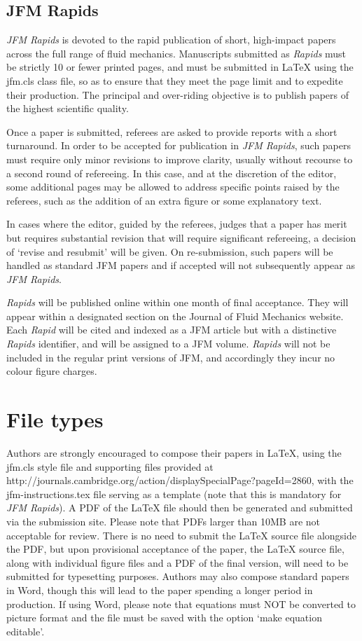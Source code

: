 \documentclass{jfm}
\begin{document}
\subsection{JFM Rapids}
{\it JFM Rapids} is devoted to the rapid publication of short, high-impact papers across the full range of fluid mechanics. Manuscripts submitted as {\it Rapids}  must be strictly 10 or fewer printed pages, and must be submitted in {\LaTeX} using the jfm.cls class file, so as to ensure that they meet the page limit and to expedite their production.  The principal and over-riding objective is to publish papers of the highest scientific quality. 

Once a paper is submitted, referees are asked to provide reports with a short turnaround.  In order to be accepted for publication in {\it JFM Rapids}, such papers must require only minor revisions to improve clarity, usually without recourse to a second round of refereeing. In this case, and at the discretion of the editor, some additional pages may be allowed to address specific points raised by the referees, such as the addition of an extra figure or some explanatory text.  

In cases where the editor, guided by the referees, judges that a paper has merit but requires substantial revision that will require significant refereeing, a decision of `revise and resubmit' will be given. On re-submission, such papers will be handled as standard JFM papers and if accepted will not subsequently appear as {\it JFM Rapids}.

{\it Rapids} will be published online within one month of final acceptance.  They will appear within a designated section on the Journal of Fluid Mechanics website.  Each {\it Rapid} will be cited and indexed as a JFM article but with a distinctive {\it Rapids} identifier, and will be assigned to a JFM volume. {\it Rapids} will not be included in the regular print versions of JFM, and accordingly they incur no colour figure charges.
 
\section{File types}\label{sec:filetypes}
Authors are strongly encouraged to compose their papers in {\LaTeX}, using the jfm.cls style file and supporting files provided at\\ http://journals.cambridge.org/action/displaySpecialPage?pageId=2860, with the jfm-instructions.tex file serving as a template (note that this is mandatory for {\it JFM Rapids}). A PDF of the {\LaTeX} file should then be generated and submitted via the submission site. Please note that PDFs larger than 10MB are not acceptable for review. There is no need to submit the {\LaTeX} source file alongside the PDF, but upon provisional acceptance of the paper, the {\LaTeX} source file, along with individual figure files and a PDF of the final version, will need to be submitted for typesetting purposes. 
Authors may also compose standard papers in Word, though this will lead to the paper spending a longer period in production. If using Word, please note that equations must NOT be converted to picture format and the file must be saved with the option `make equation editable'. 
\end{document}
